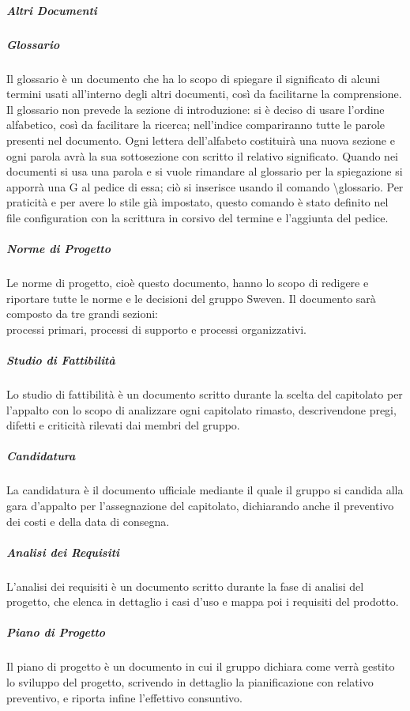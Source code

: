 \subparagraph{Altri Documenti} \hfill \linebreak
\subparagraph*{Glossario}  \hfill \linebreak
Il glossario è un documento che ha lo scopo di spiegare il significato di alcuni termini usati 
all'interno degli altri documenti, così da facilitarne la comprensione. \newline
Il glossario non prevede la sezione di introduzione: si è deciso di usare l'ordine alfabetico, 
così da facilitare la ricerca; nell'indice compariranno tutte le parole presenti nel documento. 
Ogni lettera dell'alfabeto costituirà una nuova sezione e ogni parola avrà la sua sottosezione 
con scritto il relativo significato. \newline
Quando nei documenti si usa una parola e si vuole rimandare al glossario per la spiegazione si apporrà una G al pedice di essa; ciò si inserisce usando il comando \textbackslash glossario. 
Per praticità e per avere lo stile già impostato, questo comando è stato definito nel file 
configuration con la scrittura in corsivo del termine e l'aggiunta del pedice.

\subparagraph*{Norme di Progetto}  \hfill \break
Le norme di progetto, cioè questo documento, hanno lo scopo di redigere e riportare tutte le norme 
e le decisioni del gruppo Sweven. Il documento sarà composto da tre grandi sezioni: \\
processi primari, processi di supporto e processi organizzativi.

\subparagraph*{Studio di Fattibilità} \hfill \break
Lo studio di fattibilità è un documento scritto durante la scelta del capitolato per l'appalto con 
lo scopo di analizzare ogni capitolato rimasto, descrivendone pregi, difetti e criticità rilevati dai 
membri del gruppo.

\subparagraph*{Candidatura} \hfill \break
La candidatura è il documento ufficiale mediante il quale il gruppo si candida alla gara d'appalto 
per l'assegnazione del capitolato, dichiarando anche il preventivo dei costi e della data di consegna.

\subparagraph*{Analisi dei Requisiti}  \hfill \break
L'analisi dei requisiti è un documento scritto durante la fase di analisi del progetto, che elenca in 
dettaglio i casi d'uso e mappa poi i requisiti del prodotto.

\subparagraph*{Piano di Progetto}  \hfill \break
Il piano di progetto è un documento in cui il gruppo dichiara come verrà gestito lo sviluppo del progetto,
scrivendo in dettaglio la pianificazione con relativo preventivo, e riporta infine l'effettivo consuntivo.

